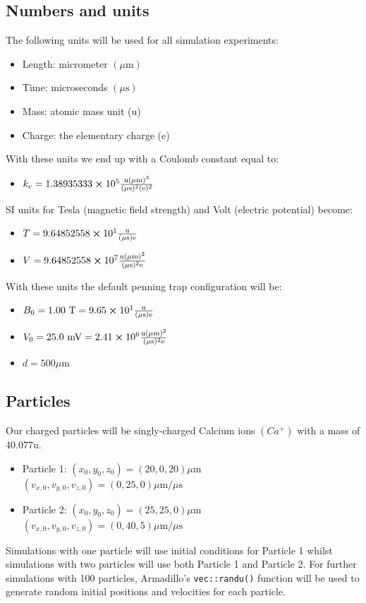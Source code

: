 \documentclass[english,notitlepage,reprint,nofootinbib]{revtex4-1}  %
\begin{document}
\subsection*{Numbers and units}
The following units will be used for all simulation experiments:
\begin{itemize}
    \item Length: micrometer $(\mu \text{m})$
    \item Time: microseconds $(\mu \text{s})$
    \item Mass: atomic mass unit (u)
    \item Charge: the elementary charge (e)
\end{itemize}
With these units we end up with a Coulomb constant equal to:
\begin{itemize}
    \item $k_e = 1.38935333 \cross 10^5 \frac{\text{u} (\mu \text{m})^3}{(\mu \text{s})^2(\text{e})^2}$
\end{itemize}
SI units for Tesla (magnetic field strength) and Volt (electric potential) become:
\begin{itemize}
    \item $T = 9.64852558 \cross 10^1 \frac{\text{u}}{(\mu \text{s})\text{e}}$
    \item $V = 9.64852558 \cross 10^7 \frac{\text{u} (\mu \text{m})^2}{(\mu \text{s})^2 \text{e}}$
\end{itemize}
With these units the default penning trap configuration will be:
\begin{itemize}
    \item $B_0 = 1.00 \text{ T} = 9.65 \cross 10^1 \frac{\text{u}}{(\mu \text{s})\text{e}}$
    \item $V_0 = 25.0 \text{ mV} = 2.41 \cross 10^6 \frac{\text{u} (\mu \text{m})^2}{(\mu \text{s})^2 \text{e}}$
    \item $d = 500 \mu \text{m}$
\end{itemize}

\subsection*{Particles}
Our charged particles will be singly-charged Calcium ions $(Ca^+)$ with a mass of $40.077$u.
\begin{itemize}
    \item Particle 1:
          \subitem $(x_0,y_0,z_0) = (20, 0, 20) \mu \text{m}$
          \subitem $(v_{x,0}, v_{y,0}, v_{z,0}) = (0, 25, 0) \mu \text{m} / \mu \text{s}$
    \item Particle 2:
          \subitem $(x_0,y_0,z_0) = (25, 25, 0) \mu \text{m}$
          \subitem $(v_{x,0}, v_{y,0}, v_{z,0}) = (0, 40, 5) \mu \text{m} / \mu \text{s}$
\end{itemize}
Simulations with one particle will use initial conditions for Particle 1 whilst simulations with two particles will use both Particle 1 and Particle 2.
For further simulations with 100 particles, Armadillo's \texttt{vec::randu()} function will be used to generate random initial
positions and velocities for each particle.
\end{document}
